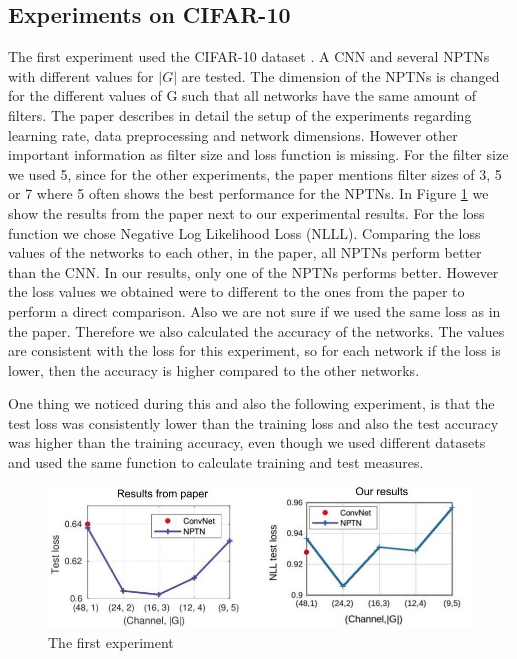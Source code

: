 \documentclass{llncs}
\begin{document}
\subsection{Experiments on CIFAR-10}
The first experiment used the CIFAR-10 dataset \cite{CIFAR}. A CNN and several NPTNs with different values for $|G|$ are tested. The dimension of the NPTNs is changed for the different values of G such that all networks have the same amount of filters.
The paper describes in detail the setup of the experiments regarding learning rate, data preprocessing and network dimensions. However other important information as filter size and loss function is missing. 
For the filter size we used 5, since for the other experiments, the paper mentions  filter sizes of 3, 5 or 7 where 5 often shows the best performance for the NPTNs. 
In Figure \ref{pic:first_experiment} we show the results from the paper next to our experimental results. For the loss function we chose Negative Log Likelihood Loss (NLLL). 
Comparing the loss values of the networks to each other, in the paper, all NPTNs perform better than the CNN. In our results, only one of the NPTNs performs better.
However the loss values we obtained were to different to the ones from the paper to perform a direct comparison. 
Also we are not sure if we used the same loss as in the paper.  Therefore we also calculated the accuracy of the networks. The values are consistent with the loss for this experiment, so for each network if the loss is lower, then the accuracy is higher compared to the other networks.

One thing we noticed during this and also the following experiment, is that the test loss was consistently lower than the training loss and also the test accuracy was higher than the training accuracy, even though we used different datasets and used the same function to calculate training and test measures.

\begin{figure}
	\begin{center}
	\includegraphics[scale=0.35]{result_images/experiment1.jpg}
	\caption{The first experiment}
	\label{pic:first_experiment}
	\end{center}
\end{figure}
\end{document}
